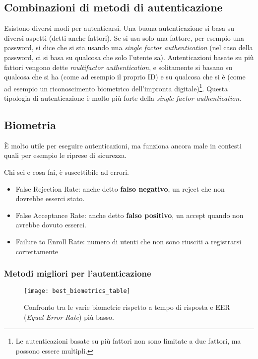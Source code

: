 \subsection{Combinazioni di metodi di autenticazione}

Esistono diversi modi per autenticarsi. Una buona autenticazione si basa su
diversi aspetti (detti anche fattori). Se si usa solo una fattore, per esempio
una password, si dice che si sta usando una \textit{single factor
authentication} (nel caso della password, ci si basa su qualcosa che solo
l'utente sa). Autenticazioni basate su pi\`u fattori vengono dette
\textit{multifactor authentication}, e solitamente si basano su qualcosa che si
ha (come ad esempio il proprio ID) e su qualcosa che si \`e (come ad esempio un
riconoscimento biometrico dell'impronta digitale)\footnote{Le autenticazioni
basate su pi\`u fattori non sono limitate a due fattori, ma
possono essere multipli.}. Questa tipologia di autenticazione \`e molto pi\`u
forte della \textit{single factor authentication}.

\subsection{Biometria}

È molto utile per eseguire autenticazioni, ma funziona ancora male in contesti
quali per esempio le riprese di sicurezza.

Chi sei e cosa fai, è suscettibile ad errori.

\begin{itemize}
\item False Rejection Rate: anche detto \textbf{falso negativo}, un reject che
non dovrebbe esserci stato.
\item False Acceptance Rate: anche detto \textbf{falso positivo}, un accept
quando non avrebbe dovuto esserci.
\item Failure to Enroll Rate: numero di utenti che non sono riusciti a
registrarsi correttamente
\end{itemize}

\subsubsection{Metodi migliori per l'autenticazione}

\begin{figure}[H]
 \centering
 \texttt{[image: best\_biometrics\_table]}
 \caption{Confronto tra le varie biometrie rispetto a tempo di risposta e EER
(\emph{Equal Error Rate}) più basso. }
\end{figure}



